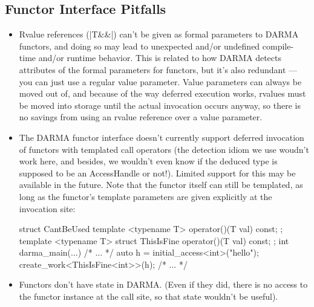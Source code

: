 \subsection{Functor Interface Pitfalls}

\begin{itemize}
  \item Rvalue references (|T&&|) can't be given as formal parameters to DARMA
  functors, and doing so may lead to unexpected and/or undefined compile-time
  and/or runtime behavior.  This is related to how DARMA detects attributes of
  the formal parameters for functors, but it's also redundant --- you can just
  use a regular value parameter.  Value parameters can always be moved out of,
  and because of the way deferred execution works, rvalues must be moved into
  storage until the actual invocation occurs anyway, so there is no savings
  from using an rvalue reference over a value parameter.
  \item The DARMA functor interface doesn't currently support deferred
  invocation of functors with templated call operators (the detection idiom we
  use woudn't work here, and besides, we wouldn't even know if the deduced type
  is supposed to be an AccessHandle or not!).  Limited support for this may be
  available in the future.  Note that the functor itself can still be
  templated, as long as the functor's template parameters are given explicitly
  at the invocation site:
\begin{CppCodeNumb}
struct CantBeUsed {
  template <typename T>
  operator()(T val) const;
};
template <typename T>
struct ThisIsFine {
  operator()(T val) const;
};
int darma_main(...) {
  /* ... */
  auto h = initial_access<int>("hello");
  create_work<ThisIsFine<int>>(h);
  /* ... */
}
\end{CppCodeNumb}
  \item Functors don't have state in DARMA.  (Even if they did, there is no
  access to the functor instance at the call site, so that state wouldn't be useful).
\end{itemize}

\lstDeleteShortInline{\|}